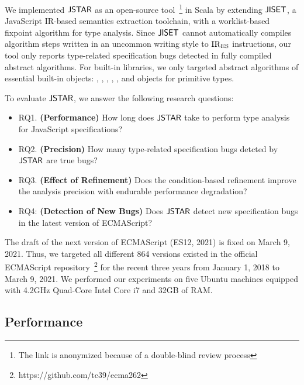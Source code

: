 We implemented $\tool$ as an open-source tool~\footnote{The link is anonymized
because of a double-blind review process} in Scala by extending $\jiset$, a
JavaScript IR-based semantics extraction toolchain, with a worklist-based
fixpoint algorithm for type analysis.  Since $\jiset$ cannot automatically
compiles algorithm steps written in an uncommon writing style to ${\text{IR}_\text{ES}}$
instructions, our tool only reports type-related specification bugs detected in
fully compiled abstract algorithms.  For built-in libraries, we only targeted
abstract algorithms of essential built-in objects: ,
, , , , and objects
for primitive types.

To evaluate $\tool$, we answer the following research questions:
\begin{itemize}
  \item RQ1. \textbf{(Performance)} How long does $\tool$ take to perform type
    analysis for JavaScript specifications?
  \item RQ2. \textbf{(Precision)} How many type-related specification bugs
    detcted by $\tool$ are true bugs?
  \item RQ3. \textbf{(Effect of Refinement)} Does the condition-based refinement
    improve the analysis precision with endurable performance degradation?
  \item RQ4: \textbf{(Detection of New Bugs)} Does $\tool$ detect new
    specification bugs in the latest version of ECMAScript?
\end{itemize}
The draft of the next version of ECMAScript (ES12, 2021) is fixed on March 9,
2021.  Thus, we targeted all different 864 versions existed in the official
ECMAScript repository~\footnote{https://github.com/tc39/ecma262} for the recent
three years from January 1, 2018 to March 9, 2021.  We performed our experiments
on five Ubuntu machines equipped with 4.2GHz Quad-Core Intel Core i7 and 32GB of
RAM.


\subsection{Performance}

